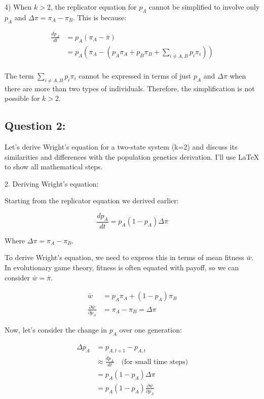 \documentclass{article}
\begin{document}
4) When $k > 2$, the replicator equation for $p_A$ cannot be simplified to involve only $p_A$ and $\Delta\pi = \pi_A - \pi_B$. This is because:

\begin{align*}
\frac{dp_A}{dt} &= p_A(\pi_A - \bar{\pi}) \\
&= p_A(\pi_A - (p_A\pi_A + p_B\pi_B + \sum_{i \neq A,B} p_i\pi_i)) \\
\end{align*}

The term $\sum_{i \neq A,B} p_i\pi_i$ cannot be expressed in terms of just $p_A$ and $\Delta\pi$ when there are more than two types of individuals. Therefore, the simplification is not possible for $k > 2$.

\subsection{Question 2:}
Let's derive Wright's equation for a two-state system (k=2) and discuss its similarities and differences with the population genetics derivation. I'll use LaTeX to show all mathematical steps.

2. Deriving Wright's equation:

Starting from the replicator equation we derived earlier:

\[ \frac{dp_A}{dt} = p_A(1-p_A)\Delta\pi \]

Where $\Delta\pi = \pi_A - \pi_B$.

To derive Wright's equation, we need to express this in terms of mean fitness $\bar{w}$. In evolutionary game theory, fitness is often equated with payoff, so we can consider $\bar{w} = \bar{\pi}$.

\begin{align*}
\bar{w} &= p_A\pi_A + (1-p_A)\pi_B \\
\frac{\partial \bar{w}}{\partial p_A} &= \pi_A - \pi_B = \Delta\pi
\end{align*}

Now, let's consider the change in $p_A$ over one generation:

\begin{align*}
\Delta p_A &= p_{A,t+1} - p_{A,t} \\
&\approx \frac{dp_A}{dt} \quad \text{(for small time steps)}\\
&= p_A(1-p_A)\Delta\pi \\
&= p_A(1-p_A)\frac{\partial \bar{w}}{\partial p_A}
\end{align*}
\end{document}
